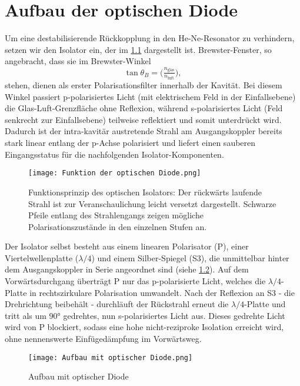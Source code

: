 \chapter{ Aufbau der optischen Diode}

Um eine destabilisierende Rückkopplung in den He-Ne-Resonator zu verhindern, setzen wir den Isolator ein, der im \cref{fig:function_of_optical_diode} dargestellt ist. 
Brewster-Fenster, so angebracht, dass sie im Brewster-Winkel \cite{introtoED} 
\begin{equation}
  \tan\theta_B = \bigl(\tfrac{n_{\mathrm{glas}}}{n_{\mathrm{luft}}}\bigr),
\end{equation}
stehen, dienen als erster Polarisationsfilter innerhalb der Kavität. 
Bei diesem Winkel passiert p-polarisiertes Licht (mit elektrischem Feld in der Einfallsebene) die Glas-Luft-Grenzfläche ohne Reflexion, während s-polarisiertes Licht (Feld senkrecht zur Einfallsebene) teilweise reflektiert und somit unterdrückt wird. 
Dadurch ist der intra-kavitär austretende Strahl am Ausgangskoppler bereits stark linear entlang der p-Achse polarisiert und liefert einen sauberen Eingangsstatus für die nachfolgenden Isolator-Komponenten.

\begin{figure}[htbp]
  \centering
  \texttt{[image: Funktion der optischen Diode.png]}
  \caption{Funktionsprinzip des optischen Isolators: Der rückwärts laufende Strahl ist zur Veranschaulichung leicht versetzt dargestellt. Schwarze Pfeile entlang des Strahlengangs zeigen mögliche Polarisationszustände in den einzelnen Stufen an. \cite{praktikum}}
  \label{fig:function_of_optical_diode}
\end{figure}

Der Isolator selbst besteht aus einem linearen Polarisator (P), einer Viertelwellenplatte ($\lambda/4$) und einem Silber-Spiegel (S3), die unmittelbar hinter dem Ausgangskoppler in Serie angeordnet sind (siehe \cref{fig:aufbau_mit_optischer_diode}). 
Auf dem Vorwärtsdurchgang überträgt P nur das p-polarisierte Licht, welches die $\lambda/4$-Platte in rechtszirkulare Polarisation umwandelt. 
Nach der Reflexion an S3 - die Drehrichtung beibehält - durchläuft der Rückstrahl erneut die $\lambda/4$-Platte und tritt als um 90° gedrehtes, nun s-polarisiertes Licht aus. 
Dieses gedrehte Licht wird von P blockiert, sodass eine hohe nicht-reziproke Isolation erreicht wird, ohne nennenswerte Einfügedämpfung im Vorwärtsweg.
\begin{figure}[htbp]
  \centering
  \texttt{[image: Aufbau mit optischer Diode.png]}
  \caption{Aufbau mit optischer Diode \cite{praktikum}}
  \label{fig:aufbau_mit_optischer_diode}
\end{figure}

